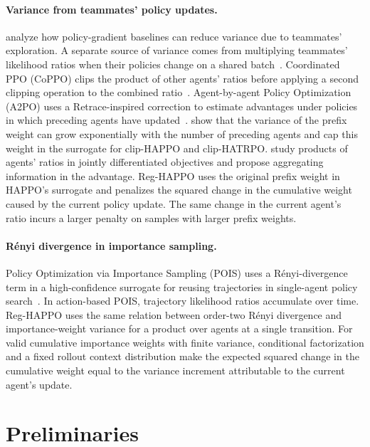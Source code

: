 \documentclass{article}
\begin{document}
\paragraph{Variance from teammates' policy updates.}
\citet{kuba2021variance} analyze how policy-gradient baselines can reduce variance due to teammates' exploration. A separate source of variance comes from multiplying teammates' likelihood ratios when their policies change on a shared batch~\citep{wu2021,le2025}. Coordinated PPO (CoPPO) clips the product of other agents' ratios before applying a second clipping operation to the combined ratio~\citep{wu2021}. Agent-by-agent Policy Optimization (A2PO) uses a Retrace-inspired correction to estimate advantages under policies in which preceding agents have updated~\citep{wang2023}. \citet{le2025} show that the variance of the prefix weight can grow exponentially with the number of preceding agents and cap this weight in the surrogate for clip-HAPPO and clip-HATRPO. \citet{zhao2026aggregate} study products of agents' ratios in jointly differentiated objectives and propose aggregating information in the advantage. Reg-HAPPO uses the original prefix weight in HAPPO's surrogate and penalizes the squared change in the cumulative weight caused by the current policy update. The same change in the current agent's ratio incurs a larger penalty on samples with larger prefix weights.

\paragraph{R\'enyi divergence in importance sampling.}
Policy Optimization via Importance Sampling (POIS) uses a R\'enyi-divergence term in a high-confidence surrogate for reusing trajectories in single-agent policy search~\citep{metelli2018,metelli2020}. In action-based POIS, trajectory likelihood ratios accumulate over time. Reg-HAPPO uses the same relation between order-two R\'enyi divergence and importance-weight variance for a product over agents at a single transition. For valid cumulative importance weights with finite variance, conditional factorization and a fixed rollout context distribution make the expected squared change in the cumulative weight equal to the variance increment attributable to the current agent's update.


\section{Preliminaries}
\end{document}
